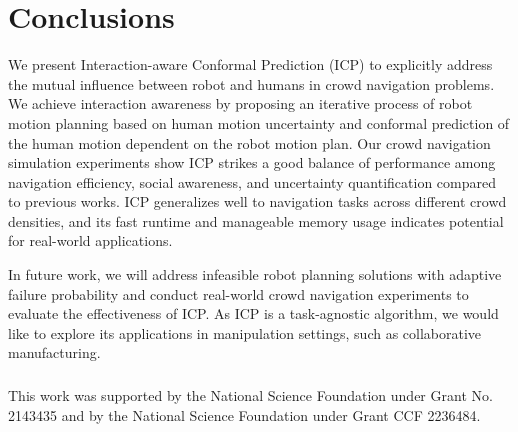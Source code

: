 \section{Conclusions}\label{sec-conclusions}
We present Interaction-aware Conformal Prediction (ICP) to explicitly address the mutual influence between robot and humans in crowd navigation problems. We achieve interaction awareness by proposing an iterative process of robot motion planning based on human motion uncertainty and conformal prediction of the human motion dependent on the robot motion plan. Our crowd navigation simulation experiments show ICP strikes a good balance of performance among navigation efficiency, social awareness, and uncertainty quantification compared to previous works. ICP generalizes well to navigation tasks across different crowd densities, and its fast runtime and manageable memory usage indicates potential for real-world applications.

In future work, we will address infeasible robot planning solutions with adaptive failure probability and conduct real-world crowd navigation experiments to evaluate the effectiveness of ICP. As ICP is a task-agnostic algorithm, we would like to explore its applications in manipulation settings, such as collaborative manufacturing.

\begin{credits}
\subsubsection{\ackname} This work was supported by the National Science Foundation under Grant No. 2143435 and by the National Science Foundation under Grant CCF 2236484.
\end{credits}
